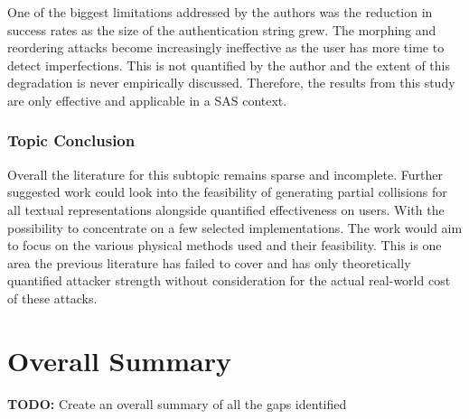 One of the biggest limitations addressed by the authors 
was the reduction in success rates as the size of the 
authentication string grew. The morphing and reordering 
attacks become increasingly ineffective as the user has 
more time to detect imperfections. This is not quantified by 
the author and the extent of this degradation is never 
empirically discussed. Therefore, the results from this 
study are only effective and applicable in a SAS context.



\subsubsection{Topic Conclusion}
Overall the literature for this subtopic remains sparse and incomplete. Further suggested work could look into the feasibility of generating partial collisions for all textual representations alongside quantified effectiveness on users. With the possibility to concentrate on a few selected implementations. The work would aim to focus on the various physical methods used and their feasibility. This is one area the previous literature has failed to cover and has only theoretically quantified attacker strength without consideration for the actual real-world cost of these attacks.

\section{Overall Summary}
\textbf{TODO: } Create an overall summary of all the gaps identified